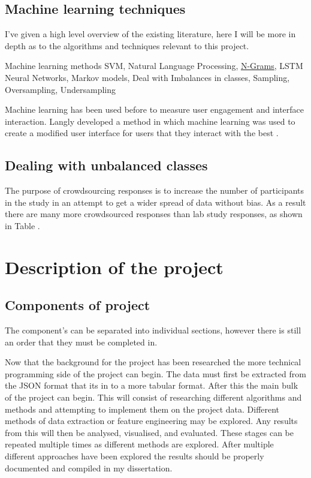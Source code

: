 \documentclass{article}
\begin{document}
\subsection{Machine learning techniques}
I've given a high level overview of the existing literature, here I will be more in depth as to the algorithms and techniques relevant to this project.

Machine learning methods
    SVM,
    Natural Language Processing,
    \underline{N-Grams},
    LSTM Neural Networks,
    Markov models,
Deal with Imbalances in classes,
    Sampling,
    Oversampling, Undersampling

Machine learning has been used before to measure user engagement and interface interaction.
Langly developed a method in which machine learning was used to create a modified user interface for users that they interact with the best \cite{langley1997machine}.


\subsection{Dealing with unbalanced classes}

The purpose of crowdsourcing responses is to increase the number of participants in the study in an attempt to get a wider spread of data without bias.
As a result there are many more crowdsourced responses than lab study responses, as shown in Table .

\section{Description of the project}

\subsection{Components of project}

The component's can be separated into individual sections, however there is still an order that they must be completed in.

Now that the background for the project has been researched the more technical programming side of the project can begin.
The data must first be extracted from the JSON format that its in to a more tabular format.
After this the main bulk of the project can begin.
This will consist of researching different algorithms and methods and attempting to implement them on the project data.
Different methods of data extraction or feature engineering may be explored.
Any results from this will then be analysed, visualised, and evaluated.
These stages can be repeated multiple times as different methods are explored.
After multiple different approaches have been explored the results should be properly documented and compiled in my dissertation.
\end{document}
